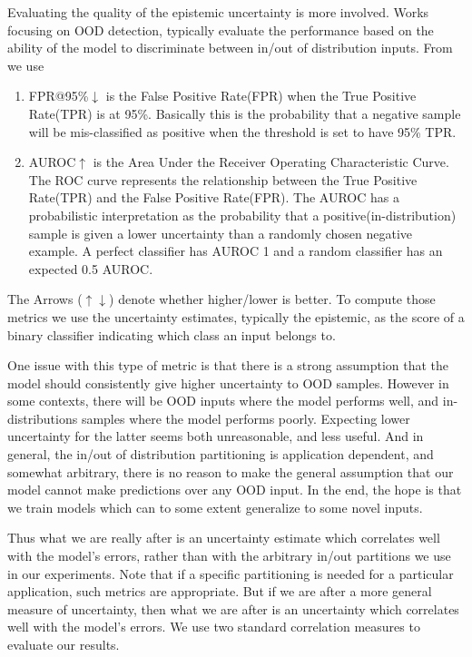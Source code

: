 \documentclass[../main.tex]{subfiles}
\begin{document}
Evaluating the quality of the epistemic uncertainty is more involved. Works~\citep{liang2017enhancing, hein2019relu, lee2017training} focusing on OOD detection, typically evaluate the performance based on the ability of the model to discriminate between in/out of distribution inputs. From~\cite{liang2017enhancing} we use 

\begin{enumerate}
    \item FPR@95\%$\downarrow$ is the False Positive Rate(FPR) when the True Positive Rate(TPR) is at 95\%. Basically this is the probability that a negative sample will be mis-classified as positive when the threshold is set to have 95\% TPR.   

    \item AUROC$\uparrow$ is the Area Under the Receiver Operating Characteristic Curve. The ROC curve represents the relationship between the True Positive Rate(TPR) and the False Positive Rate(FPR). The AUROC has a probabilistic interpretation as the probability that a positive(in-distribution) sample is given a lower uncertainty than a randomly chosen negative example. A perfect classifier has AUROC 1 and a random classifier has an expected 0.5 AUROC. 
\end{enumerate}{}
The Arrows ($\uparrow \downarrow$) denote whether higher/lower is better. To compute those metrics we use the uncertainty estimates, typically the epistemic, as the score of a binary classifier indicating which class an input belongs to. 

One issue with this type of metric is that there is a strong assumption that the model should consistently give higher uncertainty to OOD samples. However in some contexts, there will be OOD inputs where the model performs well, and in-distributions samples where the model performs poorly. Expecting lower uncertainty for the latter seems both unreasonable, and less useful. And in general, the in/out of distribution partitioning is application dependent, and somewhat arbitrary, there is no reason to make the general assumption that our model cannot make predictions over any OOD input. In the end, the hope is that we train models which can to some extent generalize to some novel inputs. 

Thus what we are really after is an uncertainty estimate which correlates well with the model's errors, rather than with the  arbitrary in/out partitions we use in our experiments. Note that if a specific partitioning is needed for a particular application, such metrics are appropriate. But if we are after a more general measure of uncertainty, then what we are after is an uncertainty which correlates well with the model's errors.  
We use two standard correlation measures to evaluate our results.
\end{document}
